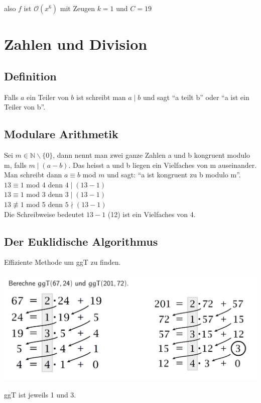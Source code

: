 \documentclass[12pt]{scrartcl}
\begin{document}
also $f$ ist $\mathcal{O}(x^6)$ mit Zeugen $k=1$ und $C = 19$


\newpage
\section{Zahlen und Division}
\subsection{Definition}
Falls $a$ ein Teiler von $b$ ist schreibt man $a \mid b$ und sagt ``a teilt b'' oder ``a ist ein Teiler von b''.

\subsection{Modulare Arithmetik}
Sei $m \in \mathbb{N} \backslash \{0\}$, dann nennt man zwei ganze Zahlen a und b kongruent modulo m, falls $m\mid (a - b)$.
Das heisst a und b liegen ein Vielfaches von m auseinander. Man schreibt dann $a \equiv b$ mod $m$ und sagt:
``a ist kongruent zu b modulo m''.\\

$13 \equiv 1$ mod 4 denn $4 \mid (13 - 1)$\\
$13 \equiv 1$ mod 3 denn $3 \mid (13 - 1)$\\
$13 \not\equiv  1$ mod 5 denn $5 \nmid (13 - 1)$\\

Die Schreibweise bedeutet $13 - 1$ (12) ist ein Vielfaches von 4.\\

\subsection{Der Euklidische Algorithmus}
Effiziente Methode um ggT zu finden.

\includegraphics[width=15cm]{img/euqlidic_algorithm.png}

ggT ist jeweils 1 und 3.
\end{document}
